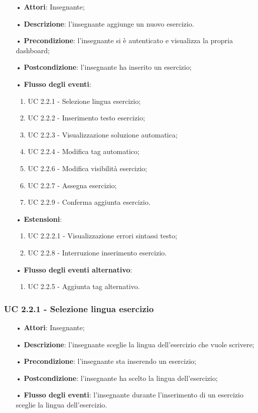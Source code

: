 \begin{itemize}
	\item[•] \textbf{Attori}: Insegnante;
	\item[•] \textbf{Descrizione}: l'insegnante aggiunge un nuovo esercizio. 
	\item[•] \textbf{Precondizione}: l'insegnante si è autenticato e visualizza la propria dashboard;
	\item[•] \textbf{Postcondizione}: l'insegnante ha inserito un esercizio;
	\item[•] \textbf{Flusso degli eventi}:
	\begin{enumerate}
		\item UC 2.2.1 - Selezione lingua esercizio;
		\item UC 2.2.2 - Inserimento testo esercizio;
		\item UC 2.2.3 - Visualizzazione soluzione automatica;
		\item UC 2.2.4 - Modifica {tag} automatico;
		\item UC 2.2.6 - Modifica visibilità esercizio;
		\item UC 2.2.7 - Assegna esercizio;
		\item UC 2.2.9 - Conferma aggiunta esercizio.
	\end{enumerate}
	\item[•] \textbf{Estensioni}:	
	\begin{enumerate}
		\item UC 2.2.2.1 - Visualizzazione errori sintassi testo;
		\item UC 2.2.8 - Interruzione inserimento esercizio.
	\end{enumerate}
	\item[•] \textbf{Flusso degli eventi alternativo}:
	\begin{enumerate}
		\item UC 2.2.5 - Aggiunta tag alternativo.
	\end{enumerate}
\end{itemize}
 

\subsubsection{UC 2.2.1 - Selezione lingua esercizio}
\begin{itemize}
	\item[•] \textbf{Attori}: Insegnante;
	\item[•] \textbf{Descrizione}: l'insegnante sceglie la lingua dell'esercizio che vuole scrivere;
	\item[•] \textbf{Precondizione}: l'insegnante sta inserendo un esercizio;
	\item[•] \textbf{Postcondizione}: l'insegnante ha scelto la lingua dell'esercizio;
	\item[•] \textbf{Flusso degli eventi}: l'insegnante durante l'inserimento di un esercizio sceglie la lingua dell'esercizio.
\end{itemize}

